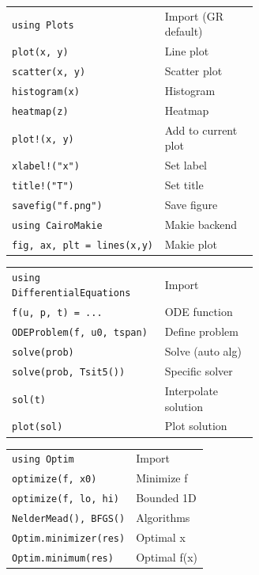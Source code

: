 \documentclass[10pt]{extarticle}
\begin{document}
\begin{multicols}{2}
\begin{tabularx}{\linewidth}{@{}>{\raggedright\arraybackslash}p{0.62\linewidth}@{\enspace}Y@{}}
\texttt{using Plots}                 & Import (GR default) \\
\texttt{plot(x, y)}                  & Line plot \\
\texttt{scatter(x, y)}              & Scatter plot \\
\texttt{histogram(x)}               & Histogram \\
\texttt{heatmap(z)}                  & Heatmap \\
\texttt{plot!(x, y)}                 & Add to current plot \\
\texttt{xlabel!("x")}               & Set label \\
\texttt{title!("T")}                & Set title \\
\texttt{savefig("f.png")}           & Save figure \\
\texttt{using CairoMakie}           & Makie backend \\
\texttt{fig, ax, plt = lines(x,y)} & Makie plot \\
\end{tabularx}

\begin{tabularx}{\linewidth}{@{}>{\raggedright\arraybackslash}p{0.62\linewidth}@{\enspace}Y@{}}
\texttt{using DifferentialEquations} & Import \\
\texttt{f(u, p, t) = ...}           & ODE function \\
\texttt{ODEProblem(f, u0, tspan)}   & Define problem \\
\texttt{solve(prob)}                 & Solve (auto alg) \\
\texttt{solve(prob, Tsit5())}       & Specific solver \\
\texttt{sol(t)}                     & Interpolate solution \\
\texttt{plot(sol)}                  & Plot solution \\
\end{tabularx}

\begin{tabularx}{\linewidth}{@{}l@{\enspace}Y@{}}
\texttt{using Optim}                 & Import \\
\texttt{optimize(f, x0)}            & Minimize f \\
\texttt{optimize(f, lo, hi)}        & Bounded 1D \\
\texttt{NelderMead(), BFGS()}       & Algorithms \\
\texttt{Optim.minimizer(res)}       & Optimal x \\
\texttt{Optim.minimum(res)}         & Optimal f(x) \\
\end{tabularx}


\end{multicols}
\end{document}
